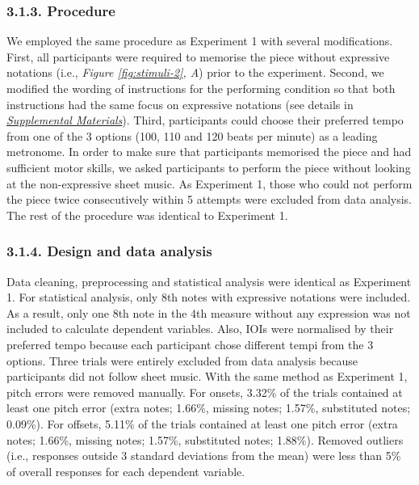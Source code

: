 \documentclass[
  english,
  man,floatsintext]{apa6}
\begin{document}
\hypertarget{procedure-2}{%
\subsubsection{3.1.3. Procedure}\label{procedure-2}}

We employed the same procedure as Experiment 1 with several modifications. First, all participants were required to memorise the piece without expressive notations (i.e., \emph{Figure \ref{fig:stimuli-2}, A}) prior to the experiment. Second, we modified the wording of instructions for the performing condition so that both instructions had the same focus on expressive notations (see details in \emph{\protect\hyperlink{supplemental}{Supplemental Materials}}). Third, participants could choose their preferred tempo from one of the 3 options (100, 110 and 120 beats per minute) as a leading metronome. In order to make sure that participants memorised the piece and had sufficient motor skills, we asked participants to perform the piece without looking at the non-expressive sheet music. As Experiment 1, those who could not perform the piece twice consecutively within 5 attempts were excluded from data analysis. The rest of the procedure was identical to Experiment 1.

\hypertarget{design-and-data-analysis-1}{%
\subsubsection{3.1.4. Design and data analysis}\label{design-and-data-analysis-1}}

Data cleaning, preprocessing and statistical analysis were identical as Experiment 1. For statistical analysis, only 8th notes with expressive notations were included. As a result, only one 8th note in the 4th measure without any expression was not included to calculate dependent variables. Also, IOIs were normalised by their preferred tempo because each participant chose different tempi from the 3 options. Three trials were entirely excluded from data analysis because participants did not follow sheet music. With the same method as Experiment 1, pitch errors were removed manually. For onsets, 3.32\% of the trials contained at least one pitch error (extra notes; 1.66\%, missing notes; 1.57\%, substituted notes; 0.09\%). For offsets, 5.11\% of the trials contained at least one pitch error (extra notes; 1.66\%, missing notes; 1.57\%, substituted notes; 1.88\%). Removed outliers (i.e., responses outside 3 standard deviations from the mean) were less than 5\% of overall responses for each dependent variable.
\end{document}

